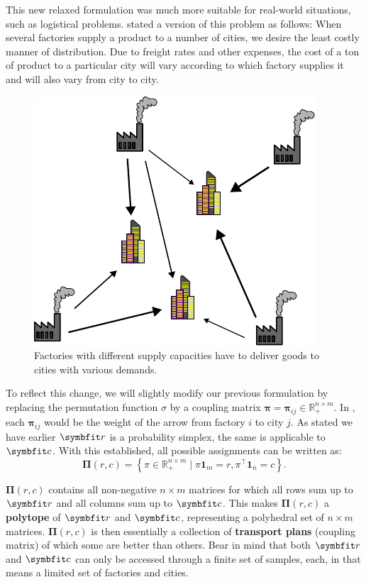 This new relaxed formulation was much more suitable for real-world situations, such as logistical problems. \textcite{hitchcock1941distribution} stated a version of this problem as follows:
When several factories supply a product to a number of cities, we desire the least costly manner of distribution. Due to freight rates and other expenses, the cost of a ton of product to a particular city will vary according to which factory supplies it and will also vary from city to city.
\begin{figure}[ht]
    \centering
    \includegraphics{chapters/assets/ot/logistic.pdf}
    \caption{Factories with different supply capacities have to deliver goods to cities with various demands.}
    \label{fig:ot-factories}
\end{figure}

To reflect this change, we will slightly modify our previous formulation by replacing the permutation function $\sigma$ by a coupling matrix $\symbf{\pi} = \symbf{\pi}_{i j} \in \mathbb{R}_{+}^{n \times m}$. In , each $\symbf{\pi}_{i j}$ would be the weight of the arrow from factory $i$ to city $j$.
As stated we have earlier $\bfitr$ is a probability simplex, the same is applicable to $\bfitc$. With this established, all possible assignments can be written as:
\begin{equation} 
\label{eqn:ot-def}
\symbf{\Pi}(r, c)=\left\{\pi \in \mathbb{R}_{+}^{n \times m} \mid \pi \symbf{1}_{m}=r, \pi^{\top} \symbf{1}_{n}=c\right\}.
\end{equation}

$\symbf{\Pi}(r, c)$ contains all non-negative $n \times m$ matrices for which all rows sum up to $\bfitr$ and all columns sum up to $\bfitc$. 
This makes $\symbf{\Pi}(r, c)$ a \textbf{polytope} of $\bfitr$ and $\bfitc$, representing a polyhedral set of $n \times m$ matrices.
$\symbf{\Pi}(r, c)$ is then essentially a collection of \textbf{transport plans} (coupling matrix) of which some are better than others.
Bear in mind that both $\bfitr$ and $\bfitc$ can only be accessed through a finite set of samples, each, in  that means a limited set of factories and cities.

